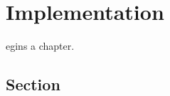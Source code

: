 \let\textcircled=\pgftextcircled
\chapter{Implementation}
\label{chap:implementation}

egins a chapter. 

\section{Section}
\label{sec:impl}

